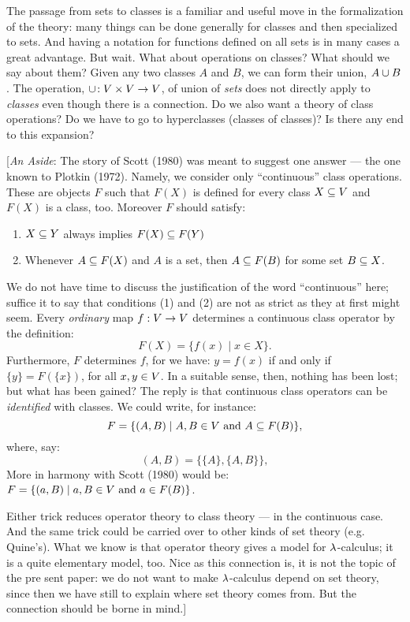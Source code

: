The passage from sets to classes is a familiar and useful move in the formalization of the
theory: many things can be done generally for classes and then specialized to sets. And
having a notation for functions defined on all sets is in many cases a great advantage.
But wait. What about operations on classes? What should we say about them? Given any two
classes $A$ and $B$, we can form their union, $A \cup  B$. The operation, $\cup\!: V
\times V \rightarrow V$, of union of {\it sets} does not directly apply to {\it classes} even
though there is a connection. Do we also want a theory of class operations? Do we have to
go to hyperclasses (classes of classes)? Is there any end to this expansion?


[{\it An Aside}: The story of Scott (1980) was meant to suggest one answer --- the one
known to Plotkin (1972). Namely, we consider only ``continuous'' class operations. These
are objects $F$ such that $F(X)$ is defined for every class $X \subseteq V$ and $F(X)$ is
a class, too. Moreover $F$ should satisfy:

\begin{enumerate}

\item $X \subseteq Y$ always implies $F(X)\subseteq F(Y)$

\item Whenever $A \subseteq F(X)$ and $A$ is a set, then $A\subseteq F(B)$ for some set $B \subseteq X$.

\end{enumerate}
%
We do not have time to discuss the justification of the word ``continuous'' here; suffice
it to say that conditions (1) and (2) are not as strict as they at first might seem. Every
{\it ordinary} map $f : V \rightarrow V$ determines a continuous class operator by the
definition:
$$
F(X) = \{f(x) \mid x \in X\}.
$$
%
Furthermore, $F$ determines $f$, for we have: $y = f(x)$ if and only if $\{y\} =
F(\{x\})$, for all $x,y \in V$. In a suitable sense, then, nothing has been lost; but
what has been gained? The reply is that continuous class operators can be {\it identified}
with classes. We could write, for instance:
$$ F = \{(A,B) \mid A,B \in V {\textrm { and }} A \subseteq F(B) \},$$ where, say:
$$
(A,B) = \{\{A\}, \{A,B\}\},
$$
More in harmony with Scott (1980) would be: $F = \{(a,B) \mid  a,B \in V {\textrm { and }
} a \in F(B)\}$.

Either trick reduces operator theory to class theory --- in the continuous case. And the
same trick could be carried over to other kinds of set theory (e.g. Quine's). What we know
is that operator theory gives a model for $\lambda$-calculus; it is a quite elementary model,
too. Nice as this connection is, it is not the topic of the pre sent paper: we do not want
to make $\lambda$-calculus depend on set theory, since then we have still to explain where set
theory comes from. But the connection should be borne in mind.]

